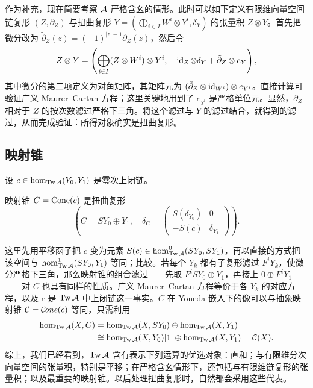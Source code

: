 作为补充，现在简要考察 $\mathcal A$ 严格含幺的情形。此时可以如下定义有限维向量空间链复形 $(Z,\partial_Z)$ 与扭曲复形 $Y=(\bigoplus_{i\in I}W^i\otimes Y^i,\delta_Y)$ 的张量积 $Z\otimes Y$。首先把微分改为 $\tilde\partial_Z(z)=(-1)^{|z|-1}\partial_Z(z)$，然后令
\begin{equation}\label{eq:3.27}
Z\otimes Y=\left(\bigoplus_{i\in I}(Z\otimes W^i)\otimes Y^i,\quad\operatorname{id}_Z\otimes\delta_Y+\tilde\partial_Z\otimes e_Y\right),
\end{equation}
其中微分的第二项定义为对角矩阵，其矩阵元为 $(\tilde\partial_Z\otimes\operatorname{id}_{W^i})\otimes e_{Y^i}$。直接计算可验证广义 Maurer–Cartan 方程；这里关键地用到了 $e_{Y^i}$ 是严格单位元。显然，$\partial_Z$ 相对于 $Z$ 的按次数滤过严格下三角。将这个滤过与 $Y$ 的滤过结合，就得到的滤过，从而完成验证：所得对象确实是扭曲复形。

\subsection{映射锥}\label{sec:3p}
设 $c\in\hom_{\operatorname{Tw}\mathcal A}(Y_0,Y_1)$ 是零次上闭链。
\begin{definition*}
映射锥 $C=\operatorname{Cone}(c)$ 是扭曲复形
\begin{equation}\label{eq:3.28}
\left(C=SY_0\oplus Y_1,\quad\delta_C=\begin{pmatrix}S(\delta_{Y_0})&0\\-S(c)&\delta_{Y_1}\end{pmatrix}\right).
\end{equation}
\end{definition*}
这里先用平移函子把 $c$ 变为元素 $S(c)\in\hom^0_{\operatorname{Tw}\mathcal A}(SY_0,SY_1)$，再以直接的方式把该空间与 $\hom^1_{\operatorname{Tw}\mathcal A}(SY_0,Y_1)$ 等同；比较。若每个 $Y_k$ 都有子复形滤过 $F^iY_k$，使微分严格下三角，那么映射锥的组合滤过——先取 $F^iSY_0\oplus Y_1$，再接上 $0\oplus F^iY_1$——对 $C$ 也具有同样的性质。广义 Maurer–Cartan 方程等价于各 $Y_k$ 的对应方程，以及 $c$ 是 $\operatorname{Tw}\mathcal A$ 中上闭链这一事实。$C$ 在 Yoneda 嵌入下的像可以与抽象映射锥 $\mathcal C=\mathcal C\!\mathit{one}(c)$ 等同，只需利用
\[
\begin{aligned}
\hom_{\operatorname{Tw}\mathcal A}(X,C)&=\hom_{\operatorname{Tw}\mathcal A}(X,SY_0)\oplus\hom_{\operatorname{Tw}\mathcal A}(X,Y_1)\\
&\cong\hom_{\operatorname{Tw}\mathcal A}(X,Y_0)[1]\oplus\hom_{\operatorname{Tw}\mathcal A}(X,Y_1)=\mathcal C(X).
\end{aligned}
\]
综上，我们已经看到，$\operatorname{Tw}\mathcal A$ 含有表示下列运算的优选对象：直和；与有限维分次向量空间的张量积，特别是平移；在严格含幺情形下，还包括与有限维链复形的张量积；以及最重要的映射锥。以后处理扭曲复形时，自然都会采用这些代表。

